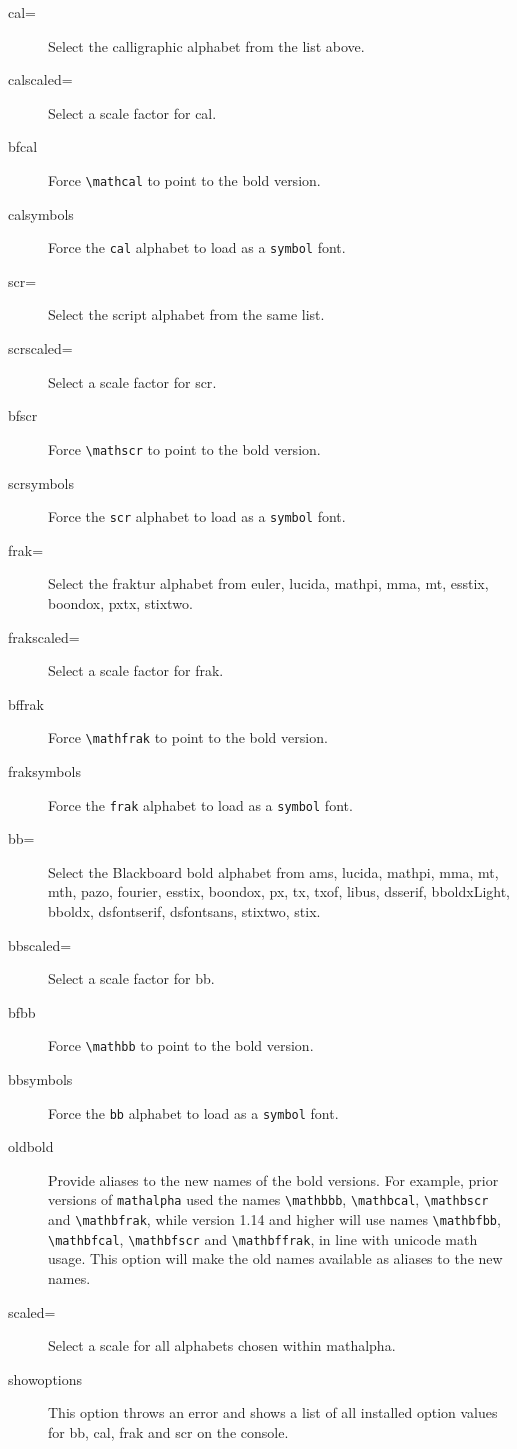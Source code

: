 \documentclass[11pt]{article}
\begin{document}
\begin{description}
\item[cal=] Select the calligraphic alphabet from the list above.
\item[calscaled=] Select a scale factor for \textsf{cal}.
\item[bfcal] Force \verb|\mathcal| to point to the bold version.
\item[calsymbols] Force the \texttt{cal} alphabet to load as a {\tt symbol} font.
\item[scr=] Select the script alphabet from the  same list.
\item[scrscaled=] Select a scale factor for \textsf{scr}.
\item[bfscr] Force \verb|\mathscr| to point to the bold version.
\item[scrsymbols] Force the \texttt{scr} alphabet to load as a {\tt symbol} font.
\item[frak=] Select the fraktur alphabet from \textsf{euler, lucida, mathpi, mma, mt, esstix, boondox, pxtx, stixtwo}.
\item[frakscaled=] Select a scale factor for \textsf{frak}.
\item[bffrak] Force \verb|\mathfrak| to point to the bold version.
\item[fraksymbols] Force the \texttt{frak} alphabet to load as a {\tt symbol} font.
\item[bb=] Select the Blackboard bold alphabet from \textsf{ams, lucida, mathpi, mma, mt, mth, pazo, fourier, esstix, boondox, px, tx, txof, libus, dsserif, bboldxLight, bboldx, dsfontserif, dsfontsans, stixtwo, stix}.
\item[bbscaled=] Select a scale factor for \textsf{bb}.
\item[bfbb] Force \verb|\mathbb| to point to the bold version.
\item[bbsymbols] Force the \texttt{bb} alphabet to load as a {\tt symbol} font.
\item[oldbold] Provide aliases to the new names of the bold versions. For example, prior versions of {\tt mathalpha} used the names \verb|\mathbbb|, \verb|\mathbcal|, \verb|\mathbscr| and \verb|\mathbfrak|, while version 1.14 and higher will use names \verb|\mathbfbb|, \verb|\mathbfcal|, \verb|\mathbfscr| and \verb|\mathbffrak|, in line with unicode math usage. This option will make the old names available as aliases to the new names.
\item[scaled=] Select a scale for all alphabets chosen within mathalpha.
\item[showoptions] This option throws an error and shows a list of all installed option values for \textsf{bb}, \textsf{cal}, \textsf{frak} and \textsf{scr} on the console.
\end{description}
\end{document}
